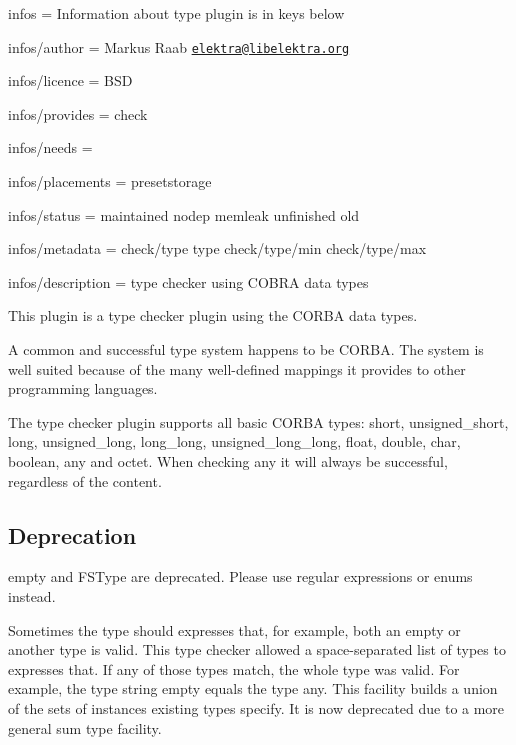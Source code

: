 
\begin{DoxyItemize}
\item infos = Information about type plugin is in keys below
\item infos/author = Markus Raab \href{mailto:elektra@libelektra.org}{\tt elektra@libelektra.\+org}
\item infos/licence = B\+SD
\item infos/provides = check
\item infos/needs =
\item infos/placements = presetstorage
\item infos/status = maintained nodep memleak unfinished old
\item infos/metadata = check/type type check/type/min check/type/max
\item infos/description = type checker using C\+O\+B\+RA data types
\end{DoxyItemize}

This plugin is a type checker plugin using the {\ttfamily C\+O\+R\+BA} data types.

A common and successful type system happens to be C\+O\+R\+BA. The system is well suited because of the many well-\/defined mappings it provides to other programming languages.

The type checker plugin supports all basic C\+O\+R\+BA types\+: {\ttfamily short}, {\ttfamily unsigned\+\_\+short}, {\ttfamily long}, {\ttfamily unsigned\+\_\+long}, {\ttfamily long\+\_\+long}, {\ttfamily unsigned\+\_\+long\+\_\+long}, {\ttfamily float}, {\ttfamily double}, {\ttfamily char}, {\ttfamily boolean}, {\ttfamily any} and {\ttfamily octet}. When checking {\ttfamily any} it will always be successful, regardless of the content.

\subsection*{Deprecation}

{\ttfamily empty} and {\ttfamily F\+S\+Type} are deprecated. Please use regular expressions or enums instead.

Sometimes the type should expresses that, for example, both an empty or another type is valid. This type checker allowed a space-\/separated list of types to expresses that. If any of those types match, the whole type was valid. For example, the type {\ttfamily string empty} equals the type {\ttfamily any}. This facility builds a union of the sets of instances existing types specify. It is now deprecated due to a more general sum type facility.

